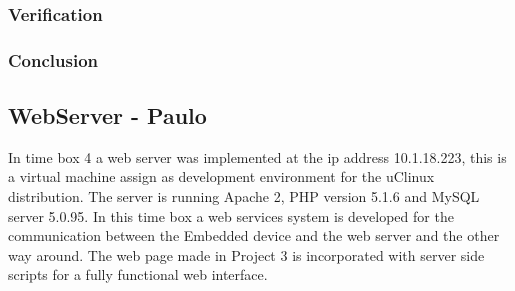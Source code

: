 \subsubsection{Verification}
%
\subsubsection{Conclusion}
\subsection{WebServer - Paulo}
%
In time box 4 a web server was implemented at the ip address 10.1.18.223, this is a virtual machine assign as development environment for the uClinux distribution. The server is running Apache 2, PHP version 5.1.6 and MySQL server 5.0.95.
In this time box a web services system is developed for the communication between the Embedded device and the web server and the other way around. The web page made in Project 3 is incorporated with server side scripts for a fully functional web interface.
